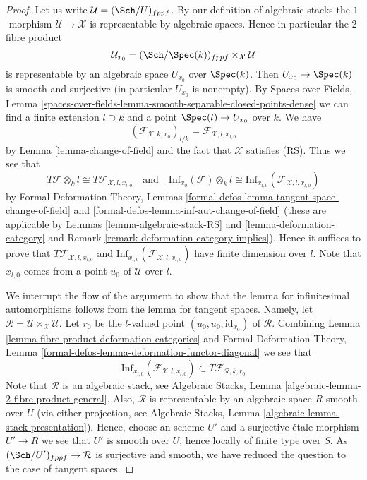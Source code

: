 \begin{proof}
Let us write $\mathcal{U} = (\Sch/U)_{fppf}$. By our definition
of algebraic stacks the $1$-morphism $\mathcal{U} \to \mathcal{X}$
is representable by algebraic spaces. Hence in particular the
2-fibre product
$$
\mathcal{U}_{x_0} = (\Sch/\Spec(k))_{fppf} \times_\mathcal{X} \mathcal{U}
$$
is representable by an algebraic space $U_{x_0}$ over $\Spec(k)$. Then
$U_{x_0} \to \Spec(k)$ is smooth and surjective (in particular $U_{x_0}$
is nonempty). By Spaces over Fields, Lemma
\ref{spaces-over-fields-lemma-smooth-separable-closed-points-dense}
we can find a finite extension $l \supset k$ and a point
$\Spec(l) \to U_{x_0}$ over $k$. We have
$$
(\mathcal{F}_{\mathcal{X}, k , x_0})_{l/k} =
\mathcal{F}_{\mathcal{X}, l, x_{l, 0}}
$$
by Lemma \ref{lemma-change-of-field} and the fact that $\mathcal{X}$
satisfies (RS). Thus we see that
$$
T\mathcal{F} \otimes_k l \cong T\mathcal{F}_{\mathcal{X}, l, x_{l, 0}}
\quad\text{and}\quad
\text{Inf}_{x_0}(\mathcal{F}) \otimes_k l \cong
\text{Inf}_{x_{l, 0}}(\mathcal{F}_{\mathcal{X}, l, x_{l, 0}})
$$
by
Formal Deformation Theory, Lemmas
\ref{formal-defos-lemma-tangent-space-change-of-field} and
\ref{formal-defos-lemma-inf-aut-change-of-field}
(these are applicable by
Lemmas \ref{lemma-algebraic-stack-RS} and
\ref{lemma-deformation-category} and
Remark \ref{remark-deformation-category-implies}).
Hence it suffices to prove that $T\mathcal{F}_{\mathcal{X}, l, x_{l, 0}}$
and $\text{Inf}_{x_{l, 0}}(\mathcal{F}_{\mathcal{X}, l, x_{l, 0}})$
have finite dimension over $l$. Note that $x_{l, 0}$ comes from a point
$u_0$ of $\mathcal{U}$ over $l$.

\medskip\noindent
We interrupt the flow of the argument to show that the lemma for
infinitesimal automorphisms follows from the lemma for tangent spaces.
Namely, let
$\mathcal{R} = \mathcal{U} \times_\mathcal{X} \mathcal{U}$.
Let $r_0$ be the $l$-valued point $(u_0, u_0, \text{id}_{x_0})$ of
$\mathcal{R}$. Combining
Lemma \ref{lemma-fibre-product-deformation-categories} and
Formal Deformation Theory, Lemma
\ref{formal-defos-lemma-deformation-functor-diagonal}
we see that
$$
\text{Inf}_{x_{l, 0}}(\mathcal{F}_{\mathcal{X}, l, x_{l, 0}})
\subset
T\mathcal{F}_{\mathcal{R}, k, r_0}
$$
Note that $\mathcal{R}$ is an algebraic stack, see
Algebraic Stacks, Lemma \ref{algebraic-lemma-2-fibre-product-general}.
Also, $\mathcal{R}$ is representable by an algebraic space $R$
smooth over $U$ (via either projection, see
Algebraic Stacks, Lemma \ref{algebraic-lemma-stack-presentation}).
Hence, choose an scheme $U'$ and a surjective \'etale morphism
$U' \to R$ we see that $U'$ is smooth over $U$, hence locally of
finite type over $S$. As $(\Sch/U')_{fppf} \to \mathcal{R}$ is
surjective and smooth, we have reduced the question to the case
of tangent spaces.


\end{proof}
